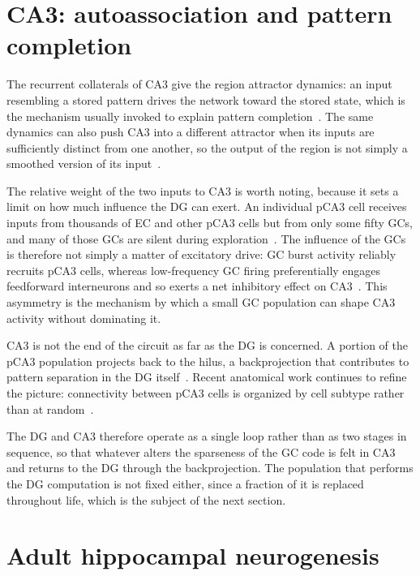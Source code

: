 \section{CA3: autoassociation and pattern completion}

The recurrent collaterals of CA3 give the region attractor dynamics: an input resembling a stored pattern drives the network
toward the stored state, which is the mechanism usually invoked to explain pattern completion~\parencite{rollsMechanisms2013,
rollsStorage2018, miglioreCA32019}. The same dynamics can also push CA3 into a different attractor when its inputs are
sufficiently distinct from one another, so the output of the region is not simply a smoothed version of its
input~\parencite{hainmuellerDentate2020}.

The relative weight of the two inputs to CA3 is worth noting, because it sets a limit on how much influence the DG can exert. An
individual pCA3 cell receives inputs from thousands of EC and other pCA3 cells but from only some fifty GCs, and many of those GCs
are silent during exploration~\parencite{hainmuellerDentate2020}. The influence of the GCs is therefore not simply a matter of
excitatory drive: GC burst activity reliably recruits pCA3 cells, whereas low-frequency GC firing preferentially engages
feedforward interneurons and so exerts a net inhibitory effect on CA3~\parencite{hainmuellerDentate2020}. This asymmetry is the
mechanism by which a small GC population can shape CA3 activity without dominating it.

CA3 is not the end of the circuit as far as the DG is concerned. A portion of the pCA3 population projects back to the hilus, a
backprojection that contributes to pattern separation in the DG itself~\parencite{myersPattern2011}. Recent anatomical work
continues to refine the picture: connectivity between pCA3 cells is organized by cell subtype rather than at
random~\parencite{sammonsSubtype2025}.

The DG and CA3 therefore operate as a single loop rather than as two stages in sequence, so that whatever alters the sparseness of
the GC code is felt in CA3 and returns to the DG through the backprojection. The population that performs the DG computation is
not fixed either, since a fraction of it is replaced throughout life, which is the subject of the next section.

\section{Adult hippocampal neurogenesis}

